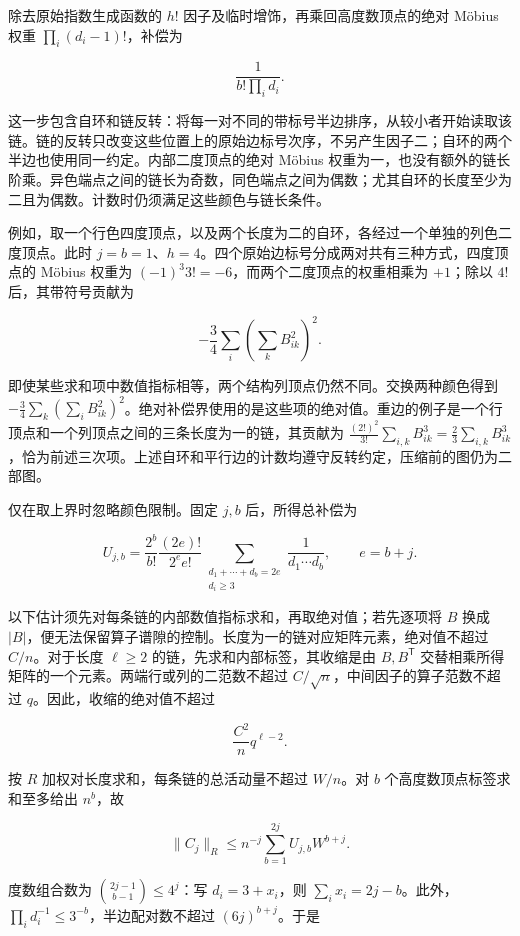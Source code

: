 \documentclass[11pt,a4paper]{article}
\begin{document}
除去原始指数生成函数的 \(h!\) 因子及临时增饰，再乘回高度数顶点的绝对 Möbius 权重 \(\prod_i(d_i-1)!\)，补偿为

\[
\frac1{b!\prod_i d_i}.
\]

这一步包含自环和链反转：将每一对不同的带标号半边排序，从较小者开始读取该链。链的反转只改变这些位置上的原始边标号次序，不另产生因子二；自环的两个半边也使用同一约定。内部二度顶点的绝对 Möbius 权重为一，也没有额外的链长阶乘。异色端点之间的链长为奇数，同色端点之间为偶数；尤其自环的长度至少为二且为偶数。计数时仍须满足这些颜色与链长条件。

例如，取一个行色四度顶点，以及两个长度为二的自环，各经过一个单独的列色二度顶点。此时 \(j=b=1\)、\(h=4\)。四个原始边标号分成两对共有三种方式，四度顶点的 Möbius 权重为 \((-1)^3 3!=-6\)，而两个二度顶点的权重相乘为 \(+1\)；除以 \(4!\) 后，其带符号贡献为

\[
-\frac34\sum_i\left(\sum_k B_{ik}^2\right)^2.
\]

即使某些求和项中数值指标相等，两个结构列顶点仍然不同。交换两种颜色得到 \(-\tfrac34\sum_k(\sum_i B_{ik}^2)^2\)。绝对补偿界使用的是这些项的绝对值。重边的例子是一个行顶点和一个列顶点之间的三条长度为一的链，其贡献为 \(\tfrac{(2!)^2}{3!}\sum_{i,k}B_{ik}^3=\tfrac23\sum_{i,k}B_{ik}^3\)，恰为前述三次项。上述自环和平行边的计数均遵守反转约定，压缩前的图仍为二部图。

仅在取上界时忽略颜色限制。固定 \(j,b\) 后，所得总补偿为

\[
U_{j,b}=
\frac{2^b}{b!}\frac{(2e)!}{2^e e!}
\sum_{\substack{d_1+\cdots+d_b=2e\\d_i\ge3}}
\frac1{d_1\cdots d_b},
\qquad e=b+j.
\]

以下估计须先对每条链的内部数值指标求和，再取绝对值；若先逐项将 \(B\) 换成 \(|B|\)，便无法保留算子谱隙的控制。长度为一的链对应矩阵元素，绝对值不超过 \(C/n\)。对于长度 \(\ell\ge2\) 的链，先求和内部标签，其收缩是由 \(B,B^{\mathsf T}\) 交替相乘所得矩阵的一个元素。两端行或列的二范数不超过 \(C/\sqrt n\)，中间因子的算子范数不超过 \(q\)。因此，收缩的绝对值不超过

\[
\frac{C^2}{n}q^{\ell-2}.
\]

按 \(R\) 加权对长度求和，每条链的总活动量不超过 \(W/n\)。对 \(b\) 个高度数顶点标签求和至多给出 \(n^b\)，故

\[
\|C_j\|_R\le n^{-j}
\sum_{b=1}^{2j}U_{j,b}W^{b+j}.
\]

度数组合数为 \(\binom{2j-1}{b-1}\le4^j\)：写 \(d_i=3+x_i\)，则 \(\sum_i x_i=2j-b\)。此外，\(\prod_i d_i^{-1}\le3^{-b}\)，半边配对数不超过 \((6j)^{b+j}\)。于是
\end{document}
